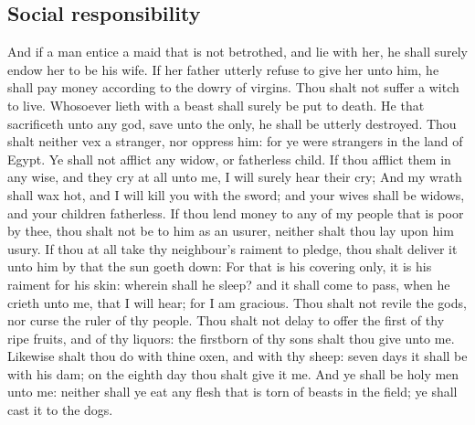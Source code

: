 \begin{biblechapter}
\section*{Social responsibility}
\verse And if a man entice a maid that is not betrothed, and lie with her, he shall surely endow her to be his wife.
\verse If her father utterly refuse to give her unto him, he shall pay money according to the dowry of virgins.
\verse Thou shalt not suffer a witch to live.
\verse Whosoever lieth with a beast shall surely be put to death.
\verse He that sacrificeth unto any god, save unto the \LORD only, he shall be utterly destroyed.
\verse Thou shalt neither vex a stranger, nor oppress him: for ye were strangers in the land of Egypt.
\verse Ye shall not afflict any widow, or fatherless child.
\verse If thou afflict them in any wise, and they cry at all unto me, I will surely hear their cry;
\verse And my wrath shall wax hot, and I will kill you with the sword; and your wives shall be widows, and your children fatherless.
\verse If thou lend money to any of my people that is poor by thee, thou shalt not be to him as an usurer, neither shalt thou lay upon him usury.
\verse If thou at all take thy neighbour's raiment to pledge, thou shalt deliver it unto him by that the sun goeth down:
\verse For that is his covering only, it is his raiment for his skin: wherein shall he sleep? and it shall come to pass, when he crieth unto me, that I will hear; for I am gracious.
\verse Thou shalt not revile the gods, nor curse the ruler of thy people.
\verse Thou shalt not delay to offer the first of thy ripe fruits, and of thy liquors: the firstborn of thy sons shalt thou give unto me.
\verse Likewise shalt thou do with thine oxen, and with thy sheep: seven days it shall be with his dam; on the eighth day thou shalt give it me.
\verse And ye shall be holy men unto me: neither shall ye eat any flesh that is torn of beasts in the field; ye shall cast it to the dogs.
\end{biblechapter}

